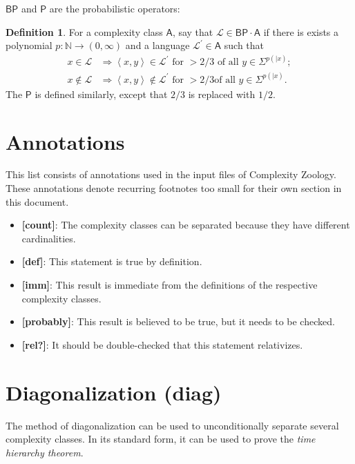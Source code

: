 \documentclass[12pt]{article}
\theoremstyle{definition}
\newtheorem{definition}[theorem]{Definition}
\theoremstyle{remark}
\newcommand{\N}{\mathbb{N}}
\newcommand{\ra}{\rightarrow}
\newcommand{\cL}{\mathcal{L}}
\newcommand{\A}{\mathsf{A}}
\newcommand{\msf}[1]{\mathsf{#1}}
\newcommand{\inner}[1]{\left\langle#1\right\rangle}
\begin{document}
$\msf{BP}$ and $\msf{P}$ are the probabilistic operators:

\begin{definition}
For a complexity class $\A$, say that $\cL\in\msf{BP}\cdot\A$ if there is
exists a polynomial $p:\N\ra(0,\infty)$ and a language $\cL^\prime\in\A$ such
that
\begin{align*}
x\in\cL&\Longrightarrow\inner{x,y}\in\cL^\prime\text{ for }>2/3\text{ of all
 }y\in\Sigma^{p(|x)}; \\
x\notin\cL&\Longrightarrow\inner{x,y}\notin\cL^\prime\text{ for }>2/3\text{
of all }y\in\Sigma^{p(|x)}.
\end{align*}
The $\msf{P}$ is defined similarly, except that $2/3$ is replaced with $1/2$.
\end{definition}

\section{Annotations}

This list consists of annotations used in the input files of Complexity
Zoology. These annotations denote recurring footnotes too small for their own
section in this document.

\begin{itemize}

\item \textbf{[count]}: The complexity classes can be separated because they
have different cardinalities.
\item \textbf{[def]}: This statement is true by definition.
\item \textbf{[imm]}: This result is immediate from the definitions of the
respective complexity classes.
\item \textbf{[probably]}: This result is believed to be true, but it needs to
be checked.
\item \textbf{[rel?]}: It should be double-checked that this statement
relativizes.

\end{itemize}

\section{Diagonalization (diag)}

The method of diagonalization can be used to unconditionally separate several
complexity classes. In its standard form, it can be used to prove the
\textit{time hierarchy theorem}.
\end{document}
